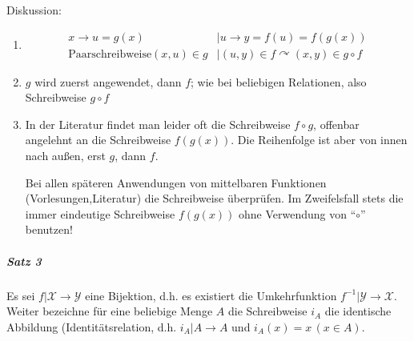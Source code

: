 \documentclass[a4paper]{scrartcl}
\begin{document}
Diskussion: 
\begin{enumerate}
\item {}
\begin{align*}
        x \rightarrow u=g(x) &| u\rightarrow y =f(u)=f(g(x))\\
\text{Paarschreibweise} (x,u) \in g &| (u,y) \in f \curvearrowright (x,y) \in g \circ f 
\end{align*}

\item $g$ wird zuerst angewendet, dann $f$; wie bei beliebigen Relationen, also Schreibweise $g \circ f$

\item In der Literatur findet man leider oft die Schreibweise $f \circ g$, offenbar angelehnt an die Schreibweise $f(g(x))$. Die Reihenfolge ist aber von innen nach außen, erst $g$, dann $f$.

\Large{Bei allen späteren Anwendungen von mittelbaren Funktionen (Vorlesungen,Literatur) die Schreibweise überprüfen. Im Zweifelsfall stets die immer eindeutige Schreibweise $f(g(x))$ ohne Verwendung von "`$\circ$"' benutzen!}
\end{enumerate}

\subparagraph{Satz 3} Es sei $f|\mathcal{X} \rightarrow \mathcal{Y}$ eine Bijektion, d.h. es existiert die Umkehrfunktion $f^{-1} | \mathcal{Y} \rightarrow \mathcal{X}$. 
Weiter bezeichne für eine beliebige Menge $A$ die Schreibweise $i_A$ die identische Abbildung (Identitätsrelation, d.h. $i_A | A \rightarrow A$ und $i_A(x)=x \, (x \in A)$.
\end{document}
